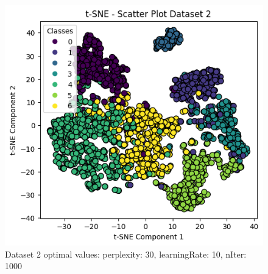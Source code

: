 \documentclass[12pt]{report}
\begin{document}
	\begin{figure}[H]
		\centering
		\includegraphics[scale=0.7]{../t-SNE/OutputPlot/Dataset2Outputplot/OptimalValues.png}
		\caption{Dataset 2 optimal values: perplexity: 30, learningRate: 10, nIter: 1000}
		\label{dataset2optimalValues}
	\end{figure}
\end{document}
